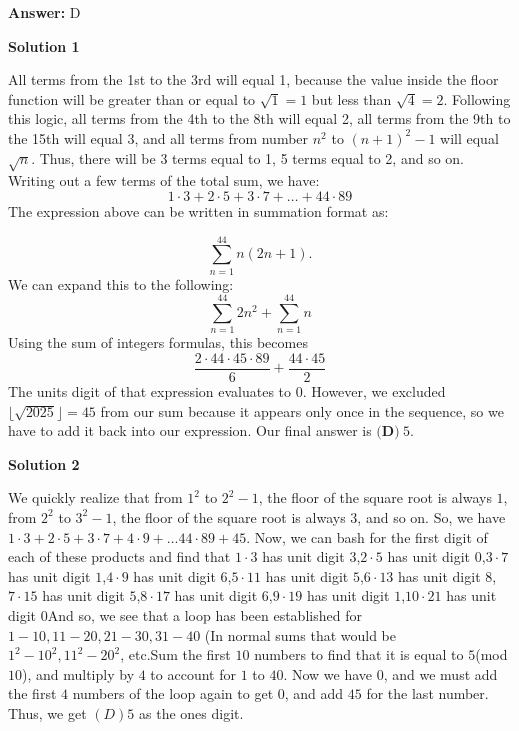 \begin{enumerate}
 \textbf{Answer: }D



\textbf{Solution 1}

All terms from the 1st to the 3rd will equal 1, because the value inside the floor function will be greater than or equal to $\sqrt{1} = 1$ but less than $\sqrt{4} = 2$. Following this logic, all terms from the 4th to the 8th will equal 2, all terms from the 9th to the 15th will equal 3, and all terms from number $n^2$ to $(n + 1)^2 - 1$ will equal $\sqrt{n}$. Thus, there will be 3 terms equal to 1, 5 terms equal to 2, and so on. Writing out a few terms of the total sum, we have:
 \[1 \cdot 3 + 2 \cdot 5 + 3 \cdot 7 + \dots + 44 \cdot 89\]The expression above can be written in summation format as:

 
 \[\sum_{n=1}^{44} n(2n + 1).\] We can expand this to the following:
 \[\sum_{n=1}^{44} 2n^2 + \sum_{n=1}^{44} n\]Using the sum of integers formulas, this becomes
 \[\frac{2 \cdot 44 \cdot 45 \cdot 89}{6} + \frac{44 \cdot 45}{2}\]The units digit of that expression evaluates to 0. However, we excluded $\lfloor \sqrt{2025} \rfloor = 45$ from our sum because it appears only once in the sequence, so we have to add it back into our expression. Our final answer is $\boxed{\textbf{(D)}\hspace{3pt}5}$.

 


 



\textbf{Solution 2}

We quickly realize that from $1^2$ to $2^2 - 1$, the floor of the square root is always $1$, from $2^2$ to $3^2 - 1$, the floor of the square root is always $3$, and so on. So, we have $1\cdot3 + 2\cdot5 + 3\cdot7 + 4\cdot9 + ... 44\cdot89 + 45$. Now, we can bash for the first digit of each of these products and find that $1\cdot3$ has unit digit $3$,$2\cdot5$ has unit digit $0$,$3\cdot7$ has unit digit $1$,$4\cdot9$ has unit digit $6$,$5\cdot11$ has unit digit $5$,$6\cdot13$ has unit digit $8$,$7\cdot15$ has unit digit $5$,$8\cdot17$ has unit digit $6$,$9\cdot19$ has unit digit $1$,$10 \cdot 21$ has unit digit $0$And so, we see that a loop has been established for $1-10, 11-20, 21-30, 31-40$ (In normal sums that would be $1^2 - 10^2, 11^2 - 20^2$, etc.Sum the first $10$ numbers to find that it is equal to $5$(mod $10$), and multiply by $4$ to account for $1$ to $40$. Now we have $0$, and we must add the first $4$ numbers of the loop again to get $0$, and add $45$ for the last number. Thus, we get $\boxed{(D)5}$ as the ones digit.


\end{enumerate}
